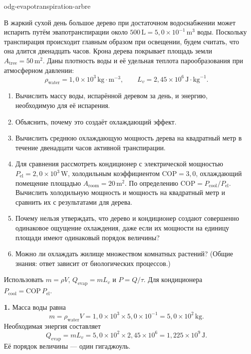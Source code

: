 \begin{exo}{odg-evapotranspiration-arbre}

В жаркий сухой день большое дерево при достаточном водоснабжении может испарить путём эвапотранспирации около $500\,\text{L}=5{,}0\times10^{-1}\,\text{m}^3$ воды. Поскольку транспирация происходит главным образом при освещении, будем считать, что она длится двенадцать часов. Крона дерева покрывает площадь земли $A_{\text{tree}}=50\,\text{m}^2$. Даны плотность воды и её удельная теплота парообразования при атмосферном давлении:
\[
\rho_{\text{water}}=1{,}0\times10^3\,\text{kg}\!\cdot\!\text{m}^{-3},
\qquad L_v=2{,}45\times10^6\,\text{J}\!\cdot\!\text{kg}^{-1}.
\]

\begin{enumerate}
  \item Вычислить массу воды, испарённой деревом за день, и энергию, необходимую для её испарения.
  \item Объяснить, почему это создаёт охлаждающий эффект.
  \item Вычислить среднюю охлаждающую мощность дерева на квадратный метр в течение двенадцати часов активной транспирации.
  \item Для сравнения рассмотреть кондиционер с электрической мощностью $P_{\mathrm{el}}=2{,}0\times10^3\,\text{W}$, холодильным коэффициентом $\mathrm{COP}=3{,}0$, охлаждающий помещение площадью $A_{\text{room}}=20\,\text{m}^2$. По определению $\mathrm{COP}=P_{\text{cool}}/P_{\mathrm{el}}$. Вычислить холодильную мощность и мощность на квадратный метр и сравнить их с результатами для дерева.
  \item Почему нельзя утверждать, что дерево и кондиционер создают совершенно одинаковое ощущение охлаждения, даже если их мощности на единицу площади имеют одинаковый порядок величины?
  \item Можно ли охлаждать жилище множеством комнатных растений? (Общие знания: ответ зависит от биологических процессов.)
\end{enumerate}

\begin{indication}
Использовать $m=\rho V$, $Q_{\mathrm{evap}}=mL_v$ и $P=Q/\tau$. Для кондиционера $P_{\text{cool}}=\mathrm{COP}\,P_{\mathrm{el}}$.
\end{indication}

\begin{solution}
\textbf{1.} Масса воды равна
\[
m=\rho_{\text{water}}V=1{,}0\times10^3\times5{,}0\times10^{-1}
=5{,}0\times10^2\,\text{kg}.
\]
Необходимая энергия составляет
\[
Q_{\mathrm{evap}}=mL_v=5{,}0\times10^2\times2{,}45\times10^6
=1{,}225\times10^9\,\text{J}.
\]
Её порядок величины — один гигаджоуль.


\end{solution}
\end{exo}
